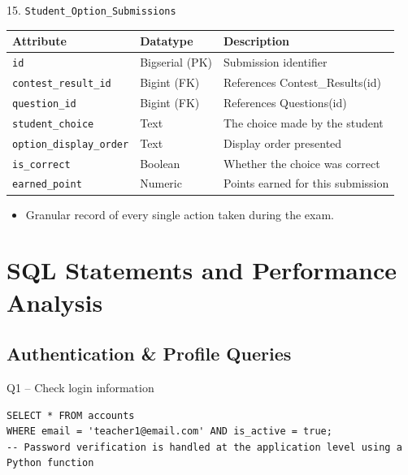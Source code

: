 \documentclass[aspectratio=169, 10pt]{beamer}
\begin{document}
\begin{frame}{15. \texttt{Student\_Option\_Submissions}}
    \centering
    \small
    \begin{tabular}{|l|l|p{8cm}|}
        \hline
        \textbf{Attribute} & \textbf{Datatype} & \textbf{Description} \\ \hline
        \texttt{id} & Bigserial (PK) & Submission identifier\\ \hline
        \texttt{contest\_result\_id} & Bigint (FK) & References Contest\_Results(id)\\ \hline
        \texttt{question\_id} & Bigint (FK) & References Questions(id)\\ \hline
        \texttt{student\_choice} & Text & The choice made by the student\\ \hline
        \texttt{option\_display\_order}& Text & Display order presented\\ \hline
        \texttt{is\_correct} & Boolean & Whether the choice was correct\\ \hline
        \texttt{earned\_point} & Numeric& Points earned for this submission\\ \hline
    \end{tabular}
    \vspace{0.3cm}
    \begin{itemize}
        \item Granular record of every single action taken during the exam.
    \end{itemize}
\end{frame}



\section{SQL Statements and Performance Analysis}

\subsection{Authentication \& Profile Queries}

\begin{frame}[fragile]{Q1 -- Check login information}
    \begin{lstlisting}
SELECT * FROM accounts 
WHERE email = 'teacher1@email.com' AND is_active = true;
-- Password verification is handled at the application level using a Python function
    \end{lstlisting}
\end{frame}
\end{document}
